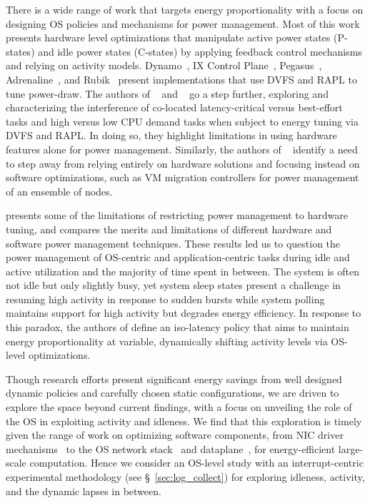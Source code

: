 There is a wide range of work
that targets energy proportionality
with a focus on designing OS policies and mechanisms for power management.
Most of this work presents hardware level optimizations
that manipulate active power states (P-states) %
and idle power states (C-states) %
by applying feedback control mechanisms %
and relying on activity models. %
Dynamo~\cite{Dynamo}, IX Control Plane~\cite{ixcp}, Pegasus~\cite{oldi-pegasus}, Adrenaline~\cite{adrenaline}, and Rubik~\cite{rubik}
present implementations
that use DVFS %
and RAPL %
to tune power-draw.
The authors of ~\cite{heracles} and ~\cite{PerAppPower} go a step further,
exploring and characterizing the interference of co-located
latency-critical versus best-effort tasks
and high versus low CPU demand tasks
when subject to energy tuning via DVFS and RAPL.
In doing so,
they highlight limitations
in using hardware features alone for power management.
Similarly, the authors of ~\cite{hotpower2008}
identify a need to step away
from relying entirely on hardware solutions
and focusing instead on software optimizations,
such as VM migration controllers for power management of an ensemble of nodes.



\cite{oldi-study} presents some of the limitations of
restricting power management to hardware tuning,
and \cite{powercap} compares the merits and limitations of
different hardware and software power management techniques.
These results led us to question
the power management of OS-centric and application-centric tasks
during idle and active utilization
and the majority of time spent in between.
The system is often not idle but only slightly busy,
yet system sleep states present a challenge in
resuming high activity in response to sudden bursts
while system polling maintains support for high activity
but degrades energy efficiency.
In response to this paradox,
the authors of \cite{oldi-pegasus} define an iso-latency policy
that aims to maintain energy proportionality
at variable, dynamically shifting activity levels
via OS-level optimizations.

Though research efforts present significant energy savings
from well designed dynamic policies
and carefully chosen static configurations,
we are driven to explore the space beyond current findings,
with a focus on unveiling the role of the OS
in exploiting activity and idleness.
We find that this exploration is timely
given the range of work on optimizing software components,
from NIC driver mechanisms~\cite{flexnic, affinityaccept, network-latency}
to the OS network stack~\cite{mtcp, sandstorm, network-latency}
and dataplane~\cite{10.1145/299764, 10.1145/2812806},
for energy-efficient large-scale computation.
Hence we consider an OS-level study
with an interrupt-centric experimental methodology (see \S~\ref{sec:log_collect}) 
for exploring idleness, activity, and the dynamic lapses in between.



